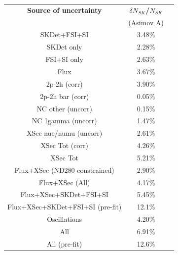\begin{table}[htb]
\centering
\begin{tabular}{| c | c | c |}
\hline
  {\bf Source of uncertainty}    & \multicolumn{1}{c|}{{\bf ${\delta}N_{SK}$/$N_{SK}$}}\\
                                 & \multicolumn{1}{c|}{(Asimov A)}\\

\hline
\hline  
SKDet+FSI+SI                   & 3.48\%                        \\
SKDet only                   & 2.28\%                        \\
FSI+SI only                   & 2.63\%                        \\
\hline
\hline
  Flux                           & 3.67\%                        \\
\hline
\hline
  2p-2h (corr)                     & 3.90\%                        \\
  2p-2h bar (corr)                  & 0.05\%                        \\
  NC other (uncorr)              & 0.15\%                        \\
  NC 1gamma (uncorr)             & 1.47\%                        \\
  XSec nue/numu (uncorr)                 & 2.61\%                        \\
\hline
  XSec Tot (corr)                  & 4.26\%                        \\
  XSec Tot                       & 5.21\%                        \\
\hline
\hline
  Flux+XSec (ND280 constrained)                      & 2.90\%                        \\
  Flux+XSec  (All)                     & 4.17\%                        \\
\hline
  Flux+XSec+SKDet+FSI+SI         & 5.45\%                        \\
  Flux+XSec+SKDet+FSI+SI (pre-fit)         & 12.1\%                        \\
\hline
\hline
  Oscillations                   & 4.20\%                        \\
\hline
\hline
  All                            & 6.91\%                        \\
  All (pre-fit) 		& 12.6\%				\\
\hline
\hline


\end{tabular}
\end{table}
